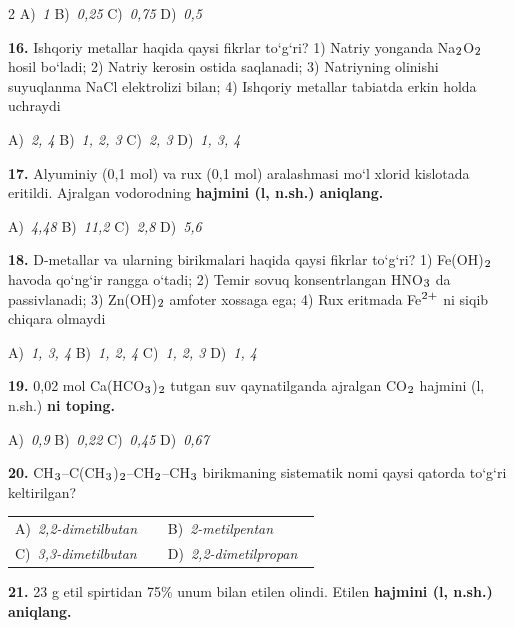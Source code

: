 \documentclass[11pt,a4paper]{article}
\renewcommand{\textsubscript}[1]{\ensuremath{_{\text{\fontsize{8}{8}\selectfont #1}}}}
\renewcommand{\textsuperscript}[1]{\ensuremath{^{\text{\fontsize{8}{8}\selectfont #1}}}}
\begin{document}
\begin{multicols}{2}
\noindent A)~\textsl{1} \hfill B)~\textsl{0,25} \hfill C)~\textsl{0,75} \hfill D)~\textsl{0,5}\par
\vspace{4pt}
\noindent\textbf{16.} Ishqoriy metallar haqida qaysi fikrlar to`g`ri? 1) Natriy yonganda Na\textsubscript{2}O\textsubscript{2} hosil bo`ladi; 2) Natriy kerosin ostida saqlanadi; 3) Natriyning olinishi suyuqlanma NaCl elektrolizi bilan; 4) Ishqoriy metallar tabiatda erkin holda uchraydi

\noindent A)~\textsl{2, 4} \hfill B)~\textsl{1, 2, 3} \hfill C)~\textsl{2, 3} \hfill D)~\textsl{1, 3, 4}\par
\vspace{4pt}
\noindent\textbf{17.} Alyuminiy (0,1 mol) va rux (0,1 mol) aralashmasi mo`l xlorid kislotada eritildi. Ajralgan vodorodning \textbf{hajmini (l, n.sh.) aniqlang.}

\noindent A)~\textsl{4,48} \hfill B)~\textsl{11,2} \hfill C)~\textsl{2,8} \hfill D)~\textsl{5,6}\par
\vspace{4pt}
\noindent\textbf{18.} D-metallar va ularning birikmalari haqida qaysi fikrlar to`g`ri? 1) Fe(OH)\textsubscript{2} havoda qo`ng`ir rangga o`tadi; 2) Temir sovuq konsentrlangan HNO\textsubscript{3} da passivlanadi; 3) Zn(OH)\textsubscript{2} amfoter xossaga ega; 4) Rux eritmada Fe\textsuperscript{2+} ni siqib chiqara olmaydi

\noindent A)~\textsl{1, 3, 4} \hfill B)~\textsl{1, 2, 4} \hfill C)~\textsl{1, 2, 3} \hfill D)~\textsl{1, 4}\par
\vspace{4pt}
\noindent\textbf{19.} 0,02 mol Ca(HCO\textsubscript{3})\textsubscript{2} tutgan suv qaynatilganda ajralgan CO\textsubscript{2} hajmini (l, n.sh.)  \textbf{ni toping.}

\noindent A)~\textsl{0,9} \hfill B)~\textsl{0,22} \hfill C)~\textsl{0,45} \hfill D)~\textsl{0,67}\par
\vspace{4pt}
\noindent\textbf{20.} CH\textsubscript{3}--C(CH\textsubscript{3})\textsubscript{2}--CH\textsubscript{2}--CH\textsubscript{3} birikmaning sistematik nomi qaysi qatorda to`g`ri keltirilgan?

\noindent\begin{tabular}{@{}p{0.47\linewidth}@{}p{0.47\linewidth}@{}}
A)~\textsl{2,2-dimetilbutan} & B)~\textsl{2-metilpentan} \\
C)~\textsl{3,3-dimetilbutan} & D)~\textsl{2,2-dimetilpropan} \\
\end{tabular}\par
\vspace{4pt}
\noindent\textbf{21.} 23 g etil spirtidan 75\% unum bilan etilen olindi. Etilen \textbf{hajmini (l, n.sh.) aniqlang.}


\end{multicols}
\end{document}
